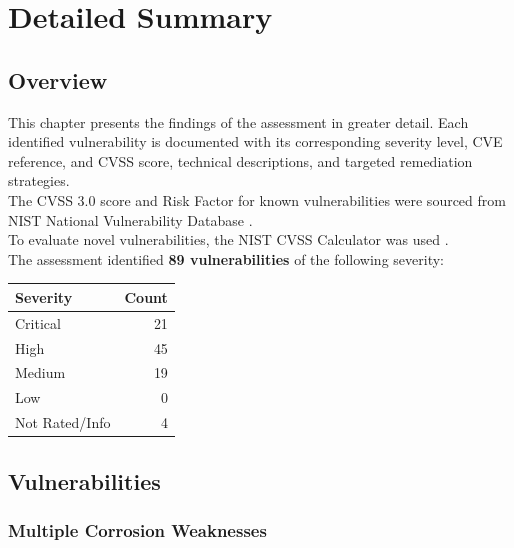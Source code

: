 \clearpage

\chapter{Detailed Summary}

\section{Overview}
This chapter presents the findings of the assessment in greater detail. Each identified vulnerability is documented with its corresponding severity level, CVE reference, and CVSS score, technical descriptions, and targeted remediation strategies.
\\

The CVSS 3.0 score and Risk Factor for known vulnerabilities were sourced from NIST National Vulnerability Database \cite{nvd}.
\\

To evaluate novel vulnerabilities, the NIST CVSS Calculator was used \cite{cvsscalc}.
\\

The assessment identified \textbf{89 vulnerabilities} of the following severity:

\begin{center}
	\begin{tabular}{lr}
		\toprule
		\textbf{Severity} & \textbf{Count} \\
		\midrule
		Critical & 21 \\
		High & 45 \\
		Medium & 19 \\
		Low & 0 \\
		Not Rated/Info & 4 \\
		\bottomrule
	\end{tabular}
\end{center}

\section{Vulnerabilities}

%
%
\subsection{Multiple Corrosion Weaknesses}


